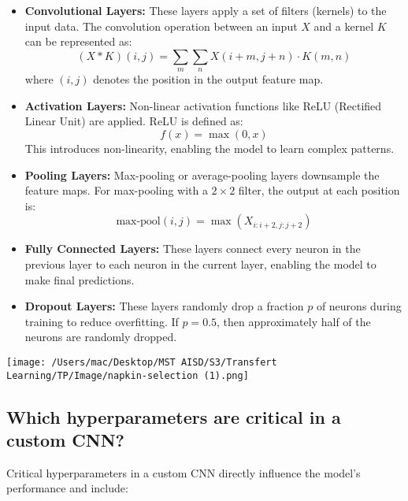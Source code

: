 \documentclass{article}
\begin{document}
\begin{itemize}
    \item \textbf{Convolutional Layers:} These layers apply a set of filters (kernels) to the input data. The convolution operation between an input \( X \) and a kernel \( K \) can be represented as:
    \[
    (X * K)(i, j) = \sum_m \sum_n X(i+m, j+n) \cdot K(m, n)
    \]
    where \( (i, j) \) denotes the position in the output feature map.
    \item \textbf{Activation Layers:} Non-linear activation functions like ReLU (Rectified Linear Unit) are applied. ReLU is defined as:
    \[
    f(x) = \max(0, x)
    \]
    This introduces non-linearity, enabling the model to learn complex patterns.
    \item \textbf{Pooling Layers:} Max-pooling or average-pooling layers downsample the feature maps. For max-pooling with a \(2 \times 2\) filter, the output at each position is:
    \[
    \text{max-pool}(i, j) = \max(X_{i:i+2, j:j+2})
    \]
    \item \textbf{Fully Connected Layers:} These layers connect every neuron in the previous layer to each neuron in the current layer, enabling the model to make final predictions.
    \item \textbf{Dropout Layers:} These layers randomly drop a fraction \(p\) of neurons during training to reduce overfitting. If \( p = 0.5 \), then approximately half of the neurons are randomly dropped.
\end{itemize}
\texttt{[image: /Users/mac/Desktop/MST AISD/S3/Transfert Learning/TP/Image/napkin-selection (1).png]}

\subsection{Which hyperparameters are critical in a custom CNN?}

Critical hyperparameters in a custom CNN directly influence the model’s performance and include:
\end{document}
